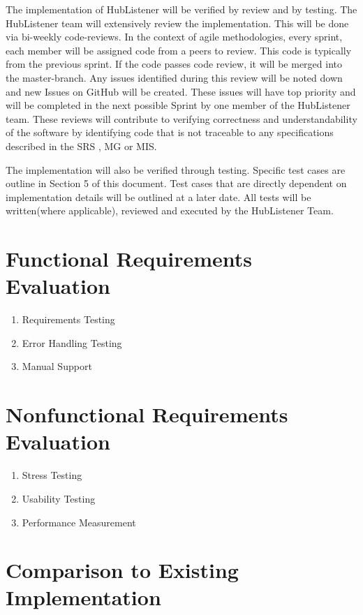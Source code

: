 \documentclass[12pt, titlepage]{article}
\begin{document}
The implementation of HubListener will be verified by review and by testing. The HubListener team will extensively review the implementation. This will be done via bi-weekly code-reviews. In the context of agile methodologies, every sprint, each member will be assigned code from a peers to review. This code is typically from the previous sprint. If the code passes code review, it will be merged into the master-branch. Any issues identified during this review will be noted down and new Issues on GitHub will be created. These issues will have top priority and will be completed in the next possible Sprint by one member of the HubListener team. These reviews will contribute to verifying correctness and understandability of the software by identifying code that is not traceable to any specifications described in the SRS , MG or MIS.
\newline

The implementation will also be verified through testing. Specific test cases are outline in Section 5 of this document. Test cases that are directly dependent on implementation details will be outlined at a later date. All tests will be written(where applicable), reviewed and executed by the HubListener Team. 

\section{Functional Requirements Evaluation}

\begin{enumerate}
  \item Requirements Testing
  \item Error Handling Testing
  \item Manual Support
\end{enumerate}



\section{Nonfunctional Requirements Evaluation}

\begin{enumerate}
  \item Stress Testing
  \item Usability Testing
  \item Performance Measurement 
\end{enumerate}

	
\section{Comparison to Existing Implementation}	
\end{document}
